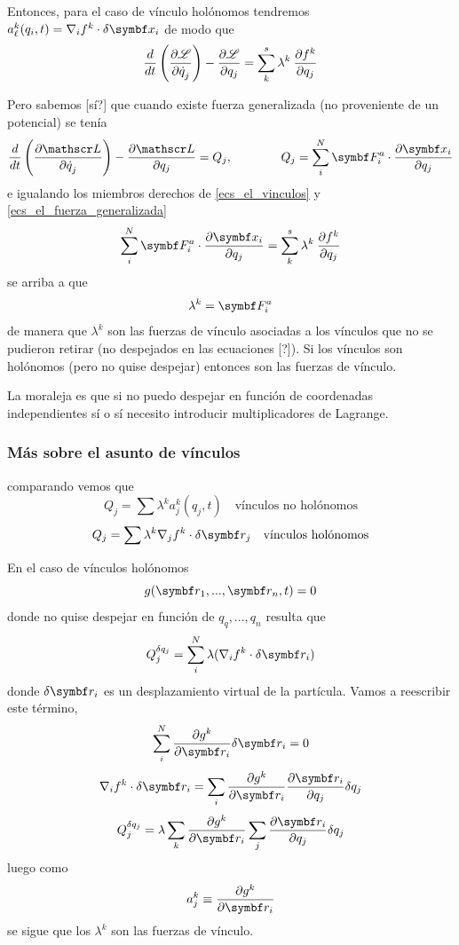 \documentclass[10pt,oneside]{CBFT_book}
\begin{document}
Entonces, para el caso de vínculo holónomos tendremos $ a^k_\ell(q_i,t) = \nabla_i f^k \cdot \delta \vb{x}_i $ de modo que
\[
	\frac{d}{dt}\left( \frac{\partial^{\hspace{-0.05em}} {\mathscr{L}}}{\partial {\dot{q}_j}^{\hspace{-0.05em}}} \right) -\frac{\partial^{\hspace{-0.05em}} {\mathscr{L}}}{\partial {q_j}^{\hspace{-0.05em}}} =
	\sum_{k}^s \lambda^k \: \frac{\partial^{\hspace{-0.05em}} {f^k}}{\partial {q_j}^{\hspace{-0.05em}}}
	\label{ecs_el_vinculos}
\]

Pero sabemos [sí?] que cuando existe fuerza generalizada (no proveniente de un potencial) se tenía 
\[
	\frac{d}{dt}\left( \dpar{\Lag}{\dot{q}_j} \right) -\dpar{\Lag}{q_j} = Q_j, \qquad \qquad 
	Q_j = \sum_i^N \vb{F}_i^a \cdot \dpar{\vb{x}_i}{q_j}
	\label{ecs_el_fuerza_generalizada}
\]
e igualando los miembros derechos de \eqref{ecs_el_vinculos} y \eqref{ecs_el_fuerza_generalizada} 
\[
	\sum_i^N \vb{F}_i^a \cdot \dpar{\vb{x}_i}{q_j} = \sum_{k}^s \lambda^k \: \dpar{f^k}{q_j}
\]
se arriba a que 
\[
	\lambda^k = \vb{F}_i^a 
\]
de manera que $\lambda^k$ son las fuerzas de vínculo asociadas a los vínculos que no se pudieron retirar
(no despejados en las ecuaciones [?]).
Si los vínculos son holónomos (pero no quise despejar) entonces son las fuerzas de vínculo.

La moraleja es que si no puedo despejar en función de coordenadas independientes sí o sí necesito introducir
multiplicadores de Lagrange.

\subsubsection{Más sobre el asunto de vínculos}

comparando vemos que 
\[
	Q_j = \sum \lambda^k a^k_j(q_j,t) \quad \textrm{vínculos no holónomos}
\]
\[
	Q_j=  \sum \lambda^k \nabla_j f^k \cdot \delta \vb{r}_j  \quad \textrm{vínculos holónomos}
\]

En el caso de vínculos holónomos 
\[
	g(\vb{r}_1,...,\vb{r}_n,t) = 0 
\]
donde no quise despejar en función de $q_q,...,q_n$ resulta que 
\[
	Q_j^{\delta q_j} =  \sum_i^N \lambda (\nabla_i f^k\cdot\delta\vb{r}_i)
\]
donde $\delta\vb{r}_i$ es un desplazamiento virtual de la partícula.
Vamos a reescribir este término,
\[
	\sum_i^N \dpar{g^k}{\vb{r}_i} \delta \vb{r}_i = 0
\]
\[
	\nabla_i f^k\cdot\delta\vb{r}_i = \sum_i \dpar{g^k}{\vb{r}_i} \dpar{\vb{r}_i}{q_j} \delta q_j
\]
\[
	Q_j^{\delta q_j} =  \lambda \sum_k \dpar{g^k}{\vb{r}_i} \sum_j \dpar{\vb{r}_i}{q_j} \delta q_j
\]
luego como 
\[
	a^k_j \equiv \dpar{g^k}{\vb{r}_i}
\]
se sigue que los $\lambda^k$ son las fuerzas de vínculo.
\end{document}
